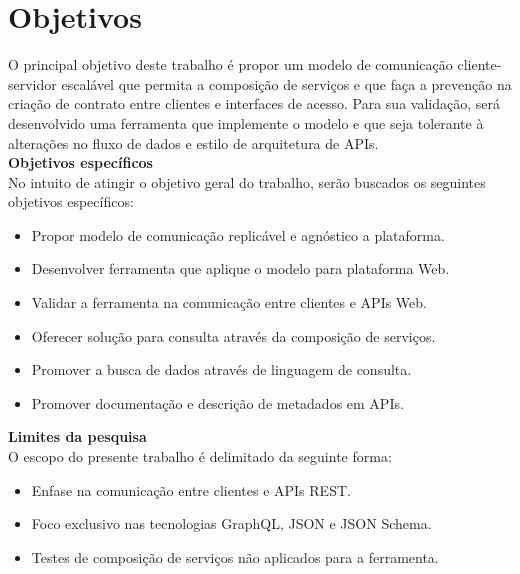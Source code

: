 \section[Objetivos]{Objetivos}

O principal objetivo deste trabalho é propor um modelo de comunicação cliente-servidor escalável que permita a composição de serviços e que faça a prevenção na criação de contrato entre clientes e interfaces de acesso. Para sua validação, será desenvolvido uma ferramenta que implemente o modelo e que seja tolerante à alterações no fluxo de dados e estilo de arquitetura de APIs. \\

\textbf{Objetivos específicos} \\

No intuito de atingir o objetivo geral do trabalho, serão buscados os seguintes objetivos específicos:

\begin{itemize}
\item Propor modelo de comunicação replicável e agnóstico a plataforma.
\item Desenvolver ferramenta que aplique o modelo para plataforma Web.
\item Validar a ferramenta na comunicação entre clientes e APIs Web.
\item Oferecer solução para consulta através da composição de serviços.
\item Promover a busca de dados através de linguagem de consulta.
\item Promover documentação e descrição de metadados em APIs. \\
\end{itemize}

\textbf{Limites da pesquisa} \\

O escopo do presente trabalho é delimitado da seguinte forma:

\begin{itemize}
\item Enfase na comunicação entre clientes e APIs REST.
\item Foco exclusivo nas tecnologias GraphQL, JSON e JSON Schema.
\item Testes de composição de serviços não aplicados para a ferramenta.
\end{itemize}
